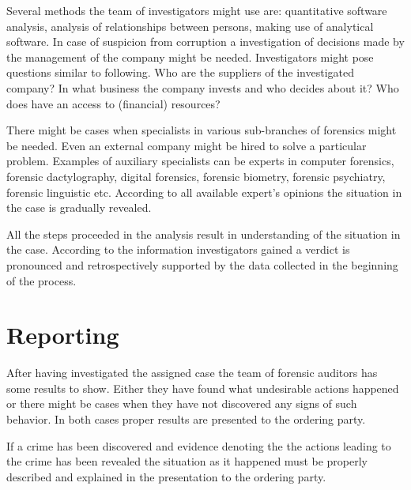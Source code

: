 Several methods the team of investigators might use are: quantitative software analysis, analysis of relationships between persons, making use of analytical software. In case of  suspicion from corruption a investigation of decisions made by the management of the company might be needed. Investigators might pose questions similar to following. Who are the suppliers of the investigated company? In what business the company invests and who decides about it? Who does have an access to (financial) resources?


There might be cases when specialists in various sub-branches of forensics might be needed. Even an external company might be hired to solve a particular problem. Examples of auxiliary specialists can be experts in computer forensics, forensic dactylography, digital forensics, forensic biometry, forensic psychiatry, forensic linguistic etc. According to all available expert's opinions the situation in the case is gradually revealed.

All the steps proceeded in the analysis result in understanding of the situation in the case. According to the information investigators gained a verdict is pronounced and retrospectively supported by the data collected in the beginning of the process. 

\section{Reporting}

After having investigated the assigned case the team of forensic auditors has some results to show. Either they have found what undesirable actions happened or there might be cases when they have not discovered any signs of such behavior. In both cases proper results are presented to the ordering party. 


If a crime has been discovered and evidence denoting the the actions leading to the crime has been revealed the situation as it happened must be properly described and explained in the presentation to the ordering party. 





